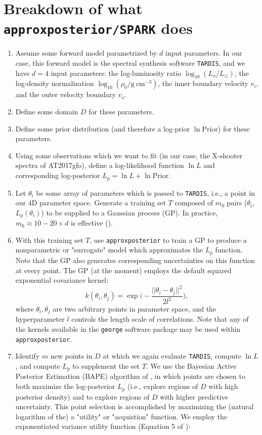 \documentclass[twocolumn]{aastex63}
\begin{document}
\section{Breakdown of what \texttt{approxposterior/SPARK} does}\label{app:SPARK}
\begin{enumerate}
    \item Assume some forward model parametrized by $d$ input parameters. In our case, this forward model is the spectral synthesis software \texttt{TARDIS}, and we have $d=4$ input parameters: the log-luminosity ratio $\log_{10}(L_o/L_{\odot})$, the log-density normalization $\log_{10}(\rho_0/\mathrm{g~cm^{-3}})$, the inner boundary velocity $v_i$, and the outer velocity boundary $v_o$. 
    \item Define some domain $D$ for these parameters. 
    \item Define some prior distribution (and therefore a log-prior $\ln\mathrm{Prior}$) for these parameters. 
    \item Using some observations which we want to fit (in our case, the X-shooter spectra of AT2017gfo), define a log-likelihood function $\ln L$ and corresponding log-posterior $L_p = \ln L + \ln\mathrm{Prior}$. 
    \item Let $\theta_i$ be some array of parameters which is passed to \texttt{TARDIS}, i.e., a point in our 4D parameter space. Generate a training set $T$ composed of $m_0$ pairs ($\theta_i$, $L_p (\theta_i)$) to be supplied to a Gaussian process (GP). In practice, $m_0 \approx 10-20 \times d$ is effective (\citealt{fleming20}).
    \item With this training set $T$, use \texttt{approxposterior} to train a GP to produce a nonparametric or "surrogate" model which approximates the $L_p$ function. Note that the GP also generates corresponding uncertainties on this function at every point. The GP (at the moment) employs the default squared exponential covariance kernel:
    \begin{equation}
    k(\theta_i, \theta_j) = \exp\Big(-\frac{||\theta_i - \theta_j||^2}{2 l^2}\Big),   
    \end{equation}
    where $\theta_i, \theta_j$ are two arbitrary points in parameter space, and the hyperparameter $l$ controls the length scale of correlations. Note that any of the kernels available in the \texttt{george} software package may be used within \texttt{approxposterior}.
    \item Identify $m$ new points in $D$ at which we again evaluate \texttt{TARDIS}, compute $\ln L$, and compute $L_p$ to supplement the set $T$. We use the Bayesian Active Posterior Estimation (BAPE) algorithm of \cite{kandasamy17}, in which points are chosen to both maximize the log-posterior $L_p$ (i.e., explore regions of $D$ with high posterior density) and to explore regions of $D$ with higher predictive uncertainty. This point selection is accomplished by maximizing the (natural logarithm of the) a "utility" or "acquistion" function. We employ the exponentiated variance utility function (Equation 5 of \citealt{kandasamy17}):

\end{enumerate}
\end{document}
